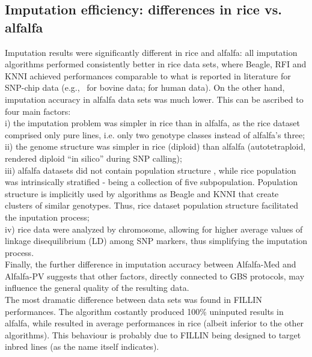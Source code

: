 \subsection{Imputation efficiency: differences in rice vs. alfalfa}
\label{sec:role_of_species}
Imputation results were significantly different in rice and alfalfa: all imputation algorithms performed consistently better in rice data sets, where Beagle, RFI and KNNI achieved performances comparable to what is reported in literature for SNP-chip data (e.g.,~\cite{vanraden_genomic_2013} for bovine data;
\cite{the_1000_genomes_project_consortium_integrated_2012}
for human data). On the other hand, imputation accuracy in alfalfa data sets was much lower. This can be ascribed to four main factors: \\
i) the imputation problem was simpler in rice than in alfalfa, as the rice dataset comprised only pure lines, i.e. only two genotype classes instead of alfalfa's three; \\
ii) the genome structure was simpler in rice (diploid) than alfalfa (autotetraploid, rendered diploid ``in silico'' during SNP calling);\\
iii) alfalfa datasets did not contain population structure \cite{Annicchiarico2015}, while rice population was intrinsically stratified - being a collection of five subpopulation. Population structure is implicitly used by algorithms as Beagle and KNNI that create clusters of similar genotypes. Thus, rice dataset population structure facilitated the inputation process;\\
iv) rice data were analyzed by chromosome, allowing for higher average values of linkage disequilibrium (LD) among SNP markers, thus simplifying the imputation process.\\
Finally, the further difference in imputation accuracy between Alfalfa-Med and Alfalfa-PV suggests that other factors, directly connected to GBS protocols, may influence the general quality of the resulting data.\\
The most dramatic difference between data sets was found in FILLIN performances. The algorithm costantly produced 100\% uninputed results in alfalfa, while resulted in average performances in rice (albeit inferior to the other algorithms). This behaviour is probably due to FILLIN being designed to target inbred lines (as the name itself indicates).

